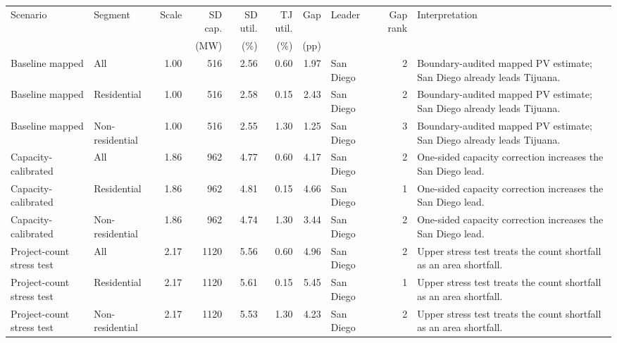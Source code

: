 \begin{tabular}{@{}p{2.55cm}p{2.25cm}rrrrrp{2.0cm}rp{3.6cm}@{}}
\toprule
Scenario & Segment & Scale & SD cap. & SD util. & TJ util. & Gap & Leader & Gap rank & Interpretation \\
 & & & (MW) & (\%) & (\%) & (pp) & & & \\
\midrule
Baseline mapped & All & 1.00 & 516 & 2.56 & 0.60 & 1.97 & San Diego & 2 & Boundary-audited mapped PV estimate; San Diego already leads Tijuana. \\
Baseline mapped & Residential & 1.00 & 516 & 2.58 & 0.15 & 2.43 & San Diego & 2 & Boundary-audited mapped PV estimate; San Diego already leads Tijuana. \\
Baseline mapped & Non-residential & 1.00 & 516 & 2.55 & 1.30 & 1.25 & San Diego & 3 & Boundary-audited mapped PV estimate; San Diego already leads Tijuana. \\
Capacity-calibrated & All & 1.86 & 962 & 4.77 & 0.60 & 4.17 & San Diego & 2 & One-sided capacity correction increases the San Diego lead. \\
Capacity-calibrated & Residential & 1.86 & 962 & 4.81 & 0.15 & 4.66 & San Diego & 1 & One-sided capacity correction increases the San Diego lead. \\
Capacity-calibrated & Non-residential & 1.86 & 962 & 4.74 & 1.30 & 3.44 & San Diego & 2 & One-sided capacity correction increases the San Diego lead. \\
Project-count stress test & All & 2.17 & 1120 & 5.56 & 0.60 & 4.96 & San Diego & 2 & Upper stress test treats the count shortfall as an area shortfall. \\
Project-count stress test & Residential & 2.17 & 1120 & 5.61 & 0.15 & 5.45 & San Diego & 1 & Upper stress test treats the count shortfall as an area shortfall. \\
Project-count stress test & Non-residential & 2.17 & 1120 & 5.53 & 1.30 & 4.23 & San Diego & 2 & Upper stress test treats the count shortfall as an area shortfall. \\
\bottomrule
\end{tabular}
